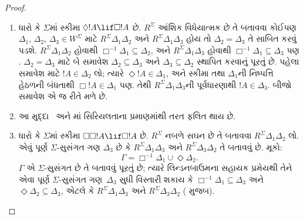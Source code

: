 \begin{proof}
  \begin{enumerate}
  \item ધારો કે $\Sigma$માં સ્કીમા $\Diamond !A \lif
    \Box !A$ છે. $R^\Sigma$ આંશિક વિધેયાત્મક છે તે બતાવવા
    કોઈપણ $\Delta_1$, $\Delta_2$, $\Delta_3 \in W^\Sigma$
    માટે $R^\Sigma \Delta_1\Delta_2$ અને $R^\Sigma
    \Delta_1\Delta_3$ હોય તો $\Delta_2=\Delta_3$ તે સાબિત કરવું
    પડશે. $R^\Sigma \Delta_1\Delta_2$ હોવાથી
    $\Box^{-1}\Delta_1 \subseteq \Delta_2$, અને
    $R^\Sigma \Delta_1\Delta_3$ હોવાથી
    $\Box^{-1}\Delta_1 \subseteq \Delta_3$ પણ
    .
    $\Delta_2=\Delta_3$ માટે બે સમાવેશ
    $\Delta_2 \subseteq \Delta_3$ અને $\Delta_3 \subseteq
    \Delta_2$ સ્થાપિત કરવાનું પૂરતું છે. પહેલા સમાવેશ માટે
    $!A \in \Delta_2$ લો; ત્યારે $\Diamond!A \in \Delta_1$,
    અને સ્કીમા તથા $\Delta_1$ની નિષ્પત્તિ હેઠળની બંધતાથી
    $\Box!A \in \Delta_1$ પણ. તેથી $R^\Sigma
    \Delta_1\Delta_3$ની પૂર્વધારણાથી $!A \in \Delta_3$.
    બીજો સમાવેશ એ જ રીતે મળે છે.

  \item આ મુદ્દા~ અને
    માં સિરિયલતાના પ્રમાણમાંથી
    તરત ફલિત થાય છે.

  \item ધારો કે $\Sigma$માં સ્કીમા $\Box\Box!A \lif \Box!A$
    છે. $R^\Sigma$ નબળે સઘન છે તે બતાવવા $R^\Sigma
    \Delta_1\Delta_2$ લો. એવું પૂર્ણ $\Sigma$-સુસંગત
    ગણ $\Delta_3$ છે કે $R^\Sigma \Delta_1\Delta_3$ અને
    $R^\Sigma \Delta_3\Delta_2$ તે બતાવવું છે. મૂકો:
    \[
    \Gamma = \Box^{-1}\Delta_1 \cup \Diamond\Delta_2.
    \]
    $\Gamma$ એ $\Sigma$-સુસંગત છે તે બતાવવું પૂરતું છે;
    ત્યારે લિન્ડનબાઉમના સહાયક પ્રમેયથી તેને એવા પૂર્ણ
    $\Sigma$-સુસંગત ગણ~$\Delta_3$ સુધી વિસ્તારી શકાય કે
    $\Box^{-1}\Delta_1 \subseteq \Delta_3$ અને
    $\Diamond\Delta_2 \subseteq \Delta_3$, એટલે કે
    $R^\Sigma \Delta_1\Delta_3$ અને $R^\Sigma
    \Delta_3\Delta_2$ (
       મુજબ).


\end{enumerate}
\end{proof}

